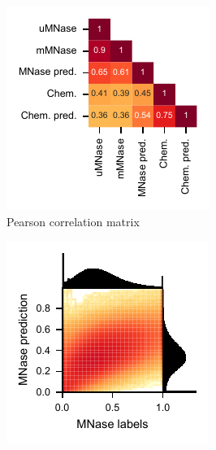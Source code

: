 \documentclass[11pt]{book}
\begin{document}
\begin{figure}[htbp]
    \centering
    \begin{subfigure}[c]{0.32\textwidth}
        \includegraphics[width=\linewidth]{Figures/Results/test_set_pcorrelation_triu.pdf}
        \caption{Pearson correlation matrix}
        \label{fig:corr_triu_matrix}
    \end{subfigure}
    \hfill
    \begin{subfigure}[c]{0.32\textwidth}
        \includegraphics[width=\linewidth]{Figures/Results/test_set_mnase_histogram.pdf}

\end{subfigure}
\end{figure}
\end{document}

